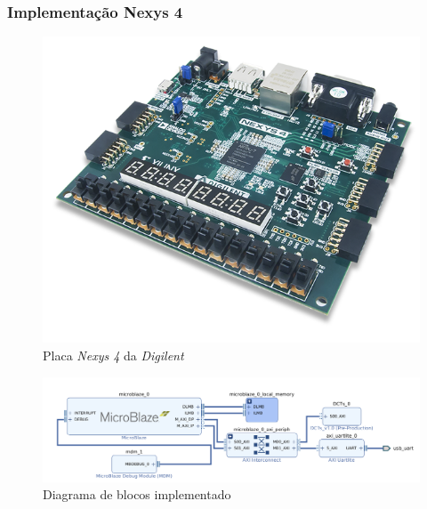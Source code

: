 \documentclass{beamer}
\begin{document}
\begin{frame}
       \frametitle{Implementação Nexys 4}
       \begin{figure}[htbp]
              \centering
              \hspace{-0.5cm}
              \begin{minipage}{.75\textwidth}
                     \includegraphics{Figures/nexys-4-0.png}
                 \end{minipage}  
                 \hspace{-1.5cm}
                 \begin{minipage}[]{.2\textwidth}
                     \caption{Placa \emph{Nexys 4} da \emph{Digilent}}
                 \end{minipage}                  
       \end{figure}
       \vspace{-0.5cm}
       \begin{figure}[htbp]
              \centering
              \includegraphics[width=\textwidth]{Figures/DCTCop.png}
              \caption{Diagrama de blocos implementado}
       \end{figure}       
\end{frame}
\end{document}
